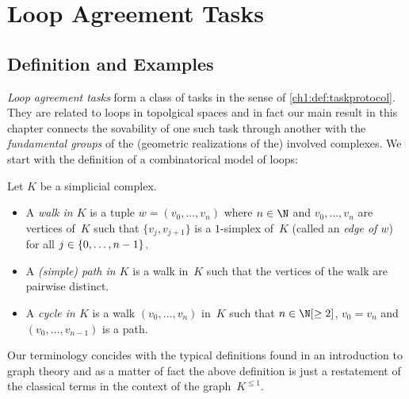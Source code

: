 \chapter{Loop Agreement Tasks}
\section{Definition and Examples}
\emph{Loop agreement tasks} form a class of tasks in the sense of
\cref{ch1:def:taskprotocol}. They are related to loops in topolgical spaces
and in fact our main result in this chapter 
connects the sovability of one such task through another with the
\emph{fundamental groups} of the (geometric realizations of the)
involved complexes. We start with the definition of a combinatorical
model of loops:

\begin{thDef}
    Let $K$ be a simplicial complex.
    \begin{itemize}
        \item
            A \emph{walk in $K$} is a tuple $w = (v_0,\dots,v_n)$
            where $n\in\N$ and $v_0,\dots,v_n$ are vertices
            of~$K$ such that $\{v_j,v_{j+1}\}$ is a $1$-simplex of~$K$
            (called an \emph{edge of $w$}) for all $j\in\{0,\ldots,n-1\}$.
            
        \item
            A \emph{(simple) path in $K$} is a walk in~$K$ such that the
            vertices of the walk are pairwise distinct.
            
        \item
            A \emph{cycle in $K$} is a walk $(v_0,\dots,v_n)$ in~$K$ such that
            $n\in\N[\geq2]$, $v_0 = v_n$ and $(v_0,\dots,v_{n-1})$ is a path.
    \end{itemize}
\end{thDef}

Our terminology concides with the typical definitions found in an introduction
to graph theory and as a matter of fact the above definition is just a
restatement of the classical terms in the context of the graph~$K^{\leq 1}$.

